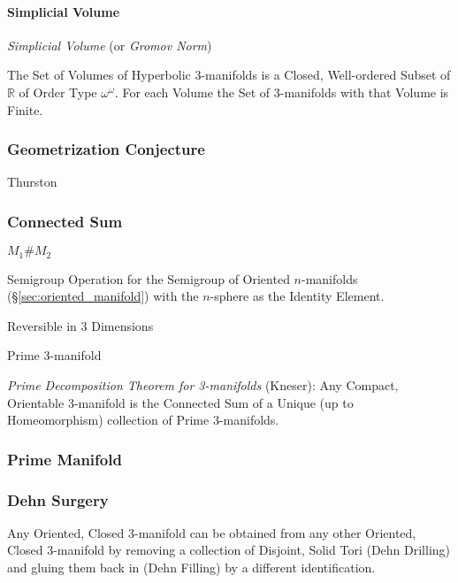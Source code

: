 \paragraph{Simplicial Volume}\label{sec:simplicial_volume}\hfill

\emph{Simplicial Volume} (or \emph{Gromov Norm})

The Set of Volumes of Hyperbolic 3-manifolds is a Closed, Well-ordered
Subset of $\mathbb{R}$ of Order Type $\omega^\omega$. For each Volume
the Set of 3-manifolds with that Volume is Finite.



\subsubsection{Geometrization Conjecture}
\label{sec:geometrization_conjecture}

Thurston



\subsubsection{Connected Sum}\label{sec:connected_sum}

$M_1 \# M_2$

Semigroup Operation for the Semigroup of Oriented $n$-manifolds
(\S\ref{sec:oriented_manifold}) with the $n$-sphere as the Identity
Element.

Reversible in 3 Dimensions

Prime 3-manifold

\emph{Prime Decomposition Theorem for 3-manifolds} (Kneser): Any
Compact, Orientable 3-manifold is the Connected Sum of a Unique (up to
Homeomorphism) collection of Prime 3-manifolds.



\subsubsection{Prime Manifold}\label{sec:prime_manifold}

\subsubsection{Dehn Surgery}\label{sec:dehn_surgery}

Any Oriented, Closed 3-manifold can be obtained from any other
Oriented, Closed 3-manifold by removing a collection of Disjoint,
Solid Tori (Dehn Drilling) and gluing them back in (Dehn Filling) by a
different identification.



